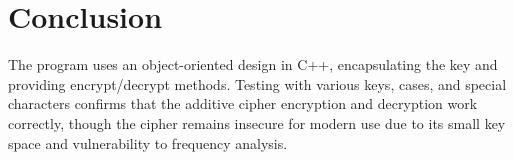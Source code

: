 \section{Conclusion}
The program uses an object-oriented design in C++, encapsulating the key and providing encrypt/decrypt methods. Testing with various keys, cases, and special characters confirms that the additive cipher encryption and decryption work correctly, though the cipher remains insecure for modern use due to its small key space and vulnerability to frequency analysis.
